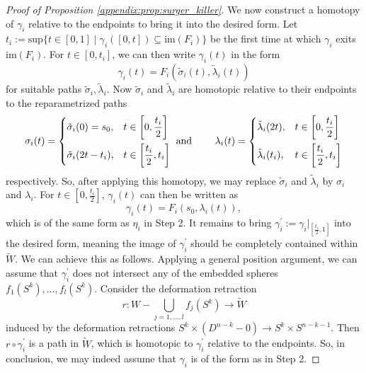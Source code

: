 \begin{proof}[Proof of Proposition \ref{appendix:prop:surger_killer}]
    We now construct a homotopy of $\gamma_i$ relative to the endpoints to bring it into the desired form. Let $t_i := \mathrm{sup}\{t \in [0,1] \mid \gamma_i([0,t]) \subseteq \mathrm{im}(F_i)\}$ be the first time at which $\gamma_i$ exits $\mathrm{im}(F_i)$. For $t \in [0,t_i]$, we can then write $\gamma_i(t)$ in the form 
    \[
    \gamma_i(t) = F_i(\tilde{\sigma}_i(t), \tilde{\lambda}_i(t))
    \]
    for suitable paths $\tilde{\sigma}_i, \tilde{\lambda}_i$. Now $\tilde{\sigma}_i$ and $\tilde{\lambda}_i$ are homotopic relative to their endpoints to the reparametrized paths 
    \[
    \begin{aligned}
    \sigma_i(t) = \begin{dcases}
    \tilde{\sigma}_i(0) = s_0, & t \in \left[0,\frac{t_i}{2}\right] \\
    \tilde{\sigma}_i(2t-t_i), & t \in \left[\frac{t_i}{2},t_i\right]
    \end{dcases} \text{ and }
    \qquad
    \lambda_i(t) = \begin{dcases}
    \tilde{\lambda}_i(2t), & t \in \left[0,\frac{t_i}{2}\right] \\
    \tilde{\lambda}_i(t_i), & t \in \left[\frac{t_i}{2},t_i\right]
    \end{dcases}
    \end{aligned}
    \]
    respectively. So, after applying this homotopy, we may replace $\tilde{\sigma}_i$ and $\tilde{\lambda}_i$ by $\sigma_i$ and $\lambda_i$. For $t \in \left[0,\frac{t_i}{2}\right]$, $\gamma_i(t)$ can then be written as 
    \[
    \gamma_i(t) = F_i(s_0,\lambda_i(t)),
    \]
    which is of the same form as $\eta_i$ in Step 2. It remains to bring $\gamma^\prime_i := \gamma_i|_{\left[\frac{t_i}{2},1\right]}$ into the desired form, meaning the image of $\gamma_i^\prime$ should be completely contained within $\tilde{W}$. We can achieve this as follows. Applying a general position argument, we can assume that $\gamma_i^\prime$ does not intersect any of the embedded spheres $f_1(S^k), \ldots, f_l(S^k)$. Consider the deformation retraction
    \[
    r \colon W - \bigcup_{j=1,\ldots,l} f_j(S^k) \to \tilde{W}
    \]
    induced by the deformation retractions $S^k \times (D^{n-k} - 0) \to S^k \times S^{n-k-1}$. Then $r \circ \gamma_i^\prime$ is a path in $\tilde{W}$, which is homotopic to $\gamma_i^\prime$ relative to the endpoints. So, in conclusion, we may indeed assume that $\gamma_i$ is of the form as in Step 2.

    \vspace{.5em}


\end{proof}
